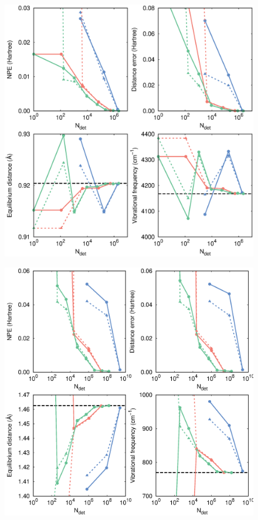 \documentclass[aip,jcp,preprint,noshowkeys,superscriptaddress]{revtex4-1}
\begin{document}
\begin{figure}%
\includegraphics[width=1.0\linewidth]{plot_pt2_rpt2_HF}
\caption{
}
\label{fig:plot_pt2_rpt2_hf}
\end{figure}

\begin{figure}%
\includegraphics[width=1.0\linewidth]{plot_pt2_rpt2_F2}
\caption{
}
\label{fig:plot_pt2_rpt2_f2}
\end{figure}
\end{document}
